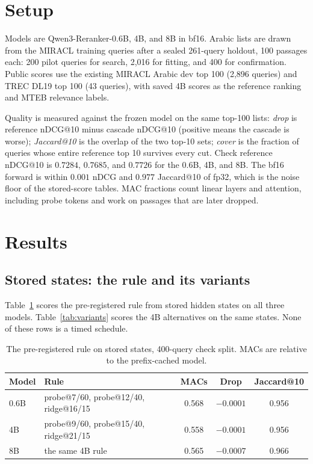 \documentclass[11pt, a4paper]{article}
\begin{document}
\section{Setup}

Models are Qwen3-Reranker-0.6B, 4B, and 8B in bf16.
Arabic lists are drawn from the MIRACL training queries after a sealed 261-query holdout, 100 passages each: 200 pilot queries for search, 2,016 for fitting, and 400 for confirmation.
Public scores use the existing MIRACL Arabic dev top 100 (2,896 queries) and TREC DL19 top 100 (43 queries), with saved 4B scores as the reference ranking and MTEB relevance labels.

Quality is measured against the frozen model on the same top-100 lists:
\emph{drop} is reference nDCG@10 minus cascade nDCG@10 (positive means the cascade is worse);
\emph{Jaccard@10} is the overlap of the two top-10 sets;
\emph{cover} is the fraction of queries whose entire reference top 10 survives every cut.
Check reference nDCG@10 is $0.7284$, $0.7685$, and $0.7726$ for the 0.6B, 4B, and 8B.
The bf16 forward is within $0.001$ nDCG and $0.977$ Jaccard@10 of fp32, which is the noise floor of the stored-score tables.
MAC fractions count linear layers and attention, including probe tokens and work on passages that are later dropped.

\section{Results}

\subsection{Stored states: the rule and its variants}

Table~\ref{tab:mac} scores the pre-registered rule from stored hidden states on all three models.
Table~\ref{tab:variants} scores the 4B alternatives on the same states.
None of these rows is a timed schedule.

\begin{table}[t]
\centering
\caption{The pre-registered rule on stored states, 400-query check split. MACs are relative to the prefix-cached model.}
\label{tab:mac}
\begin{tabular}{llccc}
\toprule
Model & Rule & MACs & Drop & Jaccard@10 \\
\midrule
0.6B & probe@7/60, probe@12/40, ridge@16/15 & 0.568 & $-0.0001$ & 0.956 \\
4B & probe@9/60, probe@15/40, ridge@21/15 & 0.558 & $-0.0001$ & 0.956 \\
8B & the same 4B rule & 0.565 & $-0.0007$ & 0.966 \\
\bottomrule
\end{tabular}
\end{table}
\end{document}
